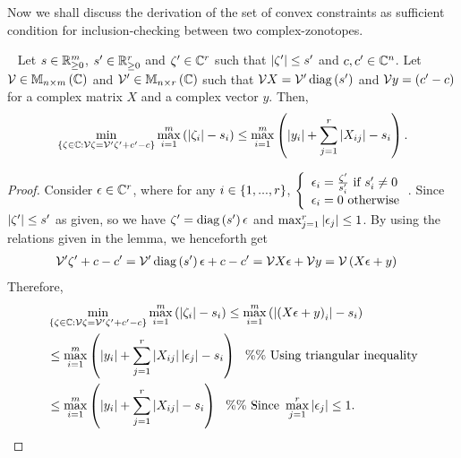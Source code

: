 Now we shall discuss the derivation of the set of convex constraints
as sufficient condition for inclusion-checking between two
complex-zonotopes.
%
\begin{lemma}~\label{lem:transfer-matrix}
  Let $s\in\mathbb{R}^m_{\geq 0}$, $s^\prime\in\mathbb{R}^r_{\geq 0}$
  and $\zeta^\prime\in\mathbb{C}^r$ such that
  $\left|\zeta^\prime\right|\leq s^\prime$ and
  $c,c^\prime\in\mathbb{C}^n$.  Let $\mathcal{V}\in\mathbb{M}_{n\times m}\left(\mathbb{C}\right)$
  and $\mathcal{V}^\prime\in\mathbb{M}_{n\times r}\left(\mathbb{C}\right)$ such that $\mathcal{V}X=\mathcal{V}^\prime\operatorname{diag}\left(s^\prime\right)$ and
  $\mathcal{V}y=\left(c^\prime-c\right)$ for a complex matrix $X$ and a
  complex vector $y$.  Then,
\begin{equation}\label{eqn:transfer-matrix}
\min_{\left\{\zeta\in\mathbb{C}:\mathcal{V}\zeta=\mathcal{V}^\prime\zeta^\prime+c^\prime-c\right\}}\max_{i=1}^m\left(\left|\zeta_i\right|-s_i\right)\leq \max_{i=1}^m\left(\left|y_i\right|+\sum_{j=1}^r\left|X_{ij}\right|-s_i\right).
\end{equation}
%
\end{lemma}
%
\begin{proof}
Consider $\epsilon\in\mathbb{C}^{r}$, where for any $i\in\left\{1,...,r\right\}$,
%
$\left\{
\begin{array}{l}
\epsilon_i=\frac{\zeta^\prime}{s^\prime_i}~\text{if}~ s^\prime_i\neq 0\\
\epsilon_i=0~\text{otherwise}
\end{array}
\right.$.
%
Since $\left|\zeta^\prime\right|\leq s^\prime$ as given, so
we have $\zeta^\prime=\operatorname{diag}\left(s^\prime\right)\epsilon$ and
$\max_{j=1}^r\left|\epsilon_j\right|\leq 1$.  By
using the relations given in the lemma, we henceforth get
%
\begin{align*}
&\mathcal{V}^\prime\zeta^\prime+c-c^\prime
=\mathcal{V}^\prime\operatorname{diag}\left(s^\prime\right)\epsilon+c-c^\prime
=\mathcal{V}X\epsilon+\mathcal{V}y
=\mathcal{V}\left(X\epsilon+y\right)
\end{align*}
%
Therefore,
%
\begin{align*}
& \min_{\left\{\zeta\in\mathbb{C}:\mathcal{V}\zeta=\mathcal{V}^\prime\zeta^\prime+c^\prime-c\right\}}\max_{i=1}^m\left(\left|\zeta_i\right|-s_i\right)\leq \max_{i=1}^m\left(\left|\left(X\epsilon+y\right)_i\right|-s_i\right)\\
&\leq \max_{i=1}^m\left(\left|y_i\right|+\sum_{j=1}^r\left|X_{ij}\right|\left|\epsilon_j\right|-s_i\right)
~~\%\%~\text{Using triangular inequality}\\
& \leq  \max_{i=1}^m\left(\left|y_i\right|+\sum_{j=1}^r\left|X_{ij}\right|-s_i\right)
~~\%\%~\text{Since}~\max_{j=1}^r\left|\epsilon_j\right|\leq 1.
\end{align*}
%
\end{proof}
